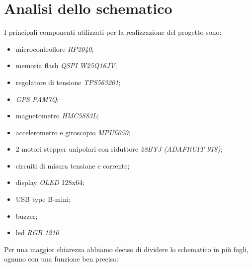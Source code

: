 \chapter{Analisi dello schematico}

I principali componenti utilizzati per la realizzazione del progetto
sono:

\begin{itemize}
\item
  
  microcontrollore \emph{RP2040};
  
\item
  
  memoria flash \emph{QSPI} \emph{W25Q16JV};
  
\item
  
  regolatore di tensione \emph{TPS563201};
  
\item
  
  \emph{GPS PAM7Q};
  
\item
  
  magnetometro \emph{HMC5883L};
  
\item
  
  accelerometro e giroscopio \emph{MPU6050};
  
\item
  
  2 motori stepper unipolari con riduttore \emph{28BYJ (ADAFRUIT 918)};
  
\item
  
  circuiti di misura tensione e corrente;
  
\item
  
  display \emph{OLED} 128x64;
  
\item
  
  USB type B-mini;
  
\item
  
  buzzer;
  
\item
  
  led \emph{RGB 1210}.
  
\end{itemize}

\noindent Per una maggior chiarezza abbiamo deciso di dividere lo schematico in
più fogli, ognuno con una funzione ben precisa:

